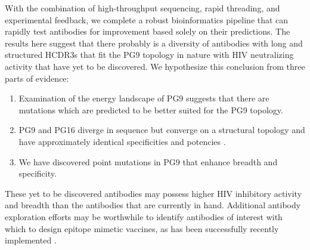 With the combination of high-throughput sequencing, rapid threading, and experimental feedback, we complete a robust bioinformatics pipeline that can rapidly test antibodies for improvement based solely on their \silico predictions. The results here suggest that there probably is a diversity of antibodies with long and structured HCDR3s that fit the PG9 topology in nature with HIV neutralizing activity that have yet to be discovered. We hypothesize this conclusion from three parts of evidence:
\begin{enumerate}
\item Examination of the energy landscape of PG9 suggests that there are mutations which are predicted to be better suited for the PG9 topology.
\item PG9 and PG16 diverge in sequence but converge on a structural topology and have approximately identical specificities and potencies \citep{McLellan:2011dg,Pejchal:2010fp,Pancera:2010hh}.
\item We have discovered point mutations in PG9 that enhance breadth and specificity.
\end{enumerate}
These yet to be discovered antibodies may possess higher HIV inhibitory activity and breadth than the antibodies that are currently in hand. Additional antibody exploration efforts may be worthwhile to identify antibodies of interest with which to design epitope mimetic vaccines, as has been successfully recently implemented \citep{Correia:2014jp,Jardine:2013hb}.



